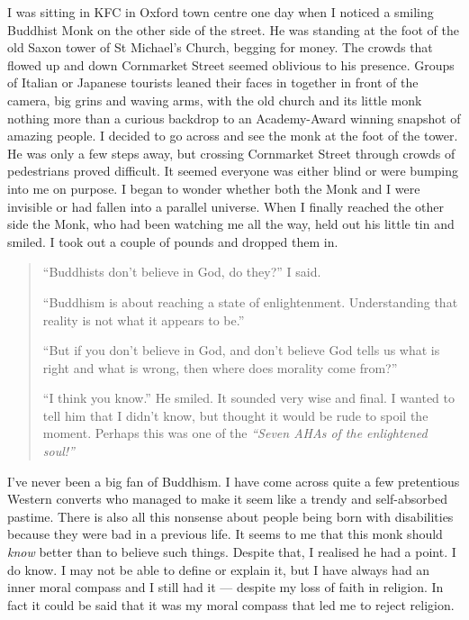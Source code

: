 \documentclass[12pt]{memoir}
\newcommand{\cor}[2]{#2} %
\def\–{-\hskip0pt}
\begin{document}
I was sitting in KFC in Oxford town centre one day
when I noticed a smiling Buddhist Monk on the other side of the street.
He was standing at the foot of the old Saxon tower of St Michael’s Church,
begging for money.
The crowds that flowed up and down Cornmarket Street
seemed oblivious to his presence.
Groups of Italian or Japanese tourists leaned their faces
in together in front of the camera,
big grins and waving arms,
with the old church and its little monk nothing more than a curious
backdrop to an Academy-Award winning snapshot of amazing people.
I decided to go across and see the monk at the foot of the tower.
He was only a few steps away, but crossing Cornmarket Street
through crowds of pedestrians proved difficult.
It seemed everyone was either blind or were bumping into me on purpose.
I began to wonder whether both the Monk and I were invisible
or had fallen into a parallel universe.
When I finally reached the other side the Monk,
who had been watching me all the way,
held out his little tin and smiled.
I took out a couple of pounds and dropped them in.

\begin{quote}
“Buddhists don’t believe in God, do they?” I said.

“Buddhism is about reaching a state of enlightenment.
Understanding that reality is not what it appears to be.”

“But if you don’t believe in God,
and don’t believe God tells us what is right and what is wrong,
then where does morality come from?”

“I think you know.” He smiled.
It sounded very wise and final.
I wanted to tell him that I didn’t know,
but thought it would be rude to spoil the moment.
Perhaps this was one of the \emph{“Seven AHAs of the enlightened soul!”}
\end{quote}

I’ve never been a big fan of Buddhism.
I have come across quite a few pretentious Western converts
who managed to make it seem like a trendy and self\–absorbed pastime.
There is also all this nonsense about people being born
with disabilities because they were bad in a previous life.
It seems to me that this monk should \emph{know} better
than to believe such things.
Despite that, I realised he had a point.
I do know. I may not be able to define or explain it,
but I have always had \cor{}{an} inner moral compass and I still had it —
despite my loss of faith in religion.
In fact it could be said that it was my moral compass
that led me to reject religion.
\end{document}
